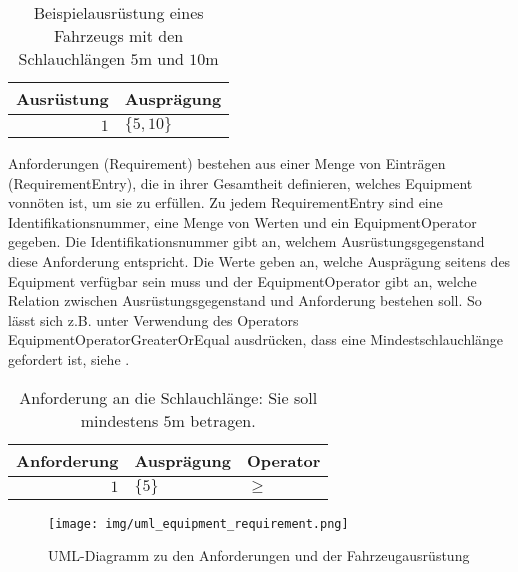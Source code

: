 \begin{table}[h]
  \centering
  \begin{tabular}{|r|l|}
    \hline
    Ausrüstung & Ausprägung \\
    \hline
    \hline
    $1$ & $\{5, 10\}$ \\
    \hline
  \end{tabular}
  \caption{Beispielausrüstung eines Fahrzeugs mit den Schlauchlängen $5$m und $10$m}
  \label{tbl:equip}
\end{table}

\noindent
Anforderungen (\textsf{Requirement}) bestehen aus einer Menge von Einträgen (\textsf{Requirement\-Entry}), die in ihrer Gesamtheit definieren, welches \textsf{Equipment} vonnöten ist, um sie zu erfüllen. Zu jedem \textsf{RequirementEntry} sind eine Identifikationsnummer, eine Menge von Werten und ein \textsf{EquipmentOperator} gegeben. Die Identifikationsnummer gibt an, welchem Ausrüstungsgegenstand diese Anforderung entspricht. Die Werte geben an, welche Ausprägung seitens des \textsf{Equipment} verfügbar sein muss und der \textsf{EquipmentOperator} gibt an, welche Relation zwischen Ausrüstungsgegenstand und Anforderung bestehen soll. So lässt sich z.B. unter Verwendung des Operators \textsf{EquipmentOperatorGreaterOrEqual} ausdrücken, dass eine Mindestschlauchlänge gefordert ist, siehe .

\begin{table}[h]
  \centering
  \begin{tabular}{|r|l|l|}
    \hline
    Anforderung & Ausprägung & Operator \\
    \hline
    \hline
    $1$ & $\{5\}$ & $\geq$ \\
    \hline
  \end{tabular}
  \caption{Anforderung an die Schlauchlänge: Sie soll mindestens $5$m betragen.}
  \label{tbl:requirement}
\end{table}

\begin{figure}[h]
  \centering
  \texttt{[image: img/uml\_equipment\_requirement.png]}
  \caption{UML-Diagramm zu den Anforderungen und der Fahrzeugausrüstung}
  \label{fig:uml_equipment_requirement}
\end{figure}

